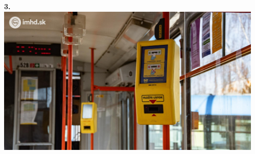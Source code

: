 \documentclass{beamer}
\begin{document}
\begin{frame}
{\begin{columns}
\begin{column}{.37\textwidth}
			\end{column}
			\begin{column}{.37\textwidth}
				\centering
				\Large \textbf{3.}\\[1em]
				\includegraphics[width=\textwidth]{kosice/ticket-stamper}
			\end{column}
		\end{columns}
		}
	\end{frame}
\end{document}
